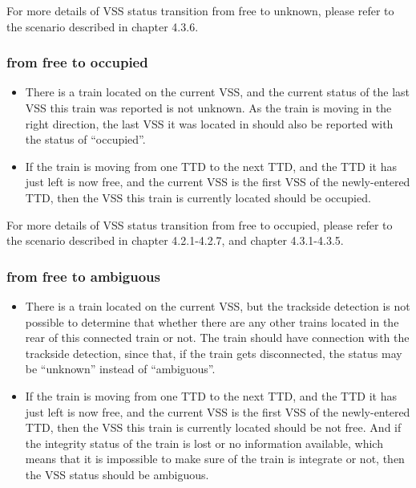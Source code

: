 \documentclass[article,dr=phil,type=msc,colorback,accentcolor=tud9c]{tudthesis}
\begin{document}
  For more details of VSS status transition from free to unknown, please refer to the scenario described in chapter 4.3.6.

  \subsubsection{from free to occupied}

  \begin{itemize}
	
	\item 
	
	There is a train located on the current VSS, and the current status of the last VSS this train was reported is not unknown. As the train is moving in the right direction, the last VSS it was located in should also be reported with the status of ``occupied''.
	
	\item 
	
	If the train is moving from one TTD to the next TTD, and the TTD it has just left is now free, and the current VSS is the first VSS of the newly-entered TTD, then the VSS this train is currently located should be occupied.
	
  \end{itemize}	

  For more details of VSS status transition from free to occupied, please refer to the scenario described in chapter 4.2.1-4.2.7, and chapter 4.3.1-4.3.5.
  	
  \subsubsection{from free to ambiguous}

  \begin{itemize}
	
	\item 
	
	There is a train located on the current VSS, but the trackside detection is not possible to determine that whether there are any other trains located in the rear of this connected train or not. The train should have connection with the trackside detection, since that, if the train gets disconnected, the status may be ``unknown'' instead of ``ambiguous''.
	
	\item 
	
	If the train is moving from one TTD to the next TTD, and the TTD it has just left is now free, and the current VSS is the first VSS of the newly-entered TTD, then the VSS this train is currently located should be not free. And if the integrity status of the train is lost or no information available, which means that it is impossible to make sure of the train is integrate or not, then the VSS status should be ambiguous.
	
  \end{itemize} 
\end{document}
